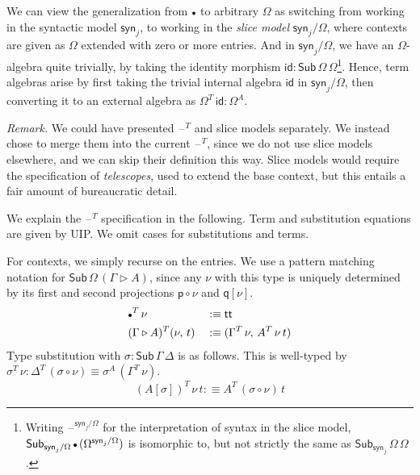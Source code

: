\documentclass[12pt,a4paper,twoside,openany]{book}
\theoremstyle{remark}
\theoremstyle{definition}
\theoremstyle{theorem}
\newcommand{\id}{\mathsf{id}}
\newcommand{\Sub}{\mathsf{Sub}}
\renewcommand{\tt}{\mathsf{tt}}
\newcommand{\blank}{\mathord{\hspace{1pt}\text{--}\hspace{1pt}}}
\newcommand{\ext}{\triangleright}
\newcommand{\emptycon}{\scaleobj{.75}\bullet}
\newcommand{\p}{\mathsf{p}}
\newcommand{\q}{\mathsf{q}}
\newcommand{\syn}{\mathsf{syn}}
\newcommand{\defn}{:\equiv}
\begin{document}
We can view the generalization from $\emptycon$ to arbitrary $\Omega$ as
switching from working in the syntactic model $\syn_j$, to working in the
\emph{slice model} $\syn_j/\Omega$, where contexts are given as $\Omega$ extended with
zero or more entries. And in $\syn_j/\Omega$, we have an $\Omega$-algebra quite
trivially, by taking the identity morphism $\id :
\Sub\,\Omega\,\Omega$\footnote{Writing $\blank^{\syn_j/\Omega}$ for the interpretation
of syntax in the slice model,
$\Sub_{\syn_j/\Omega}\,\emptycon\,(\Omega^{\syn_j/\Omega})$ is isomorphic to, but not
strictly the same as $\Sub_{\syn_j}\,\Omega\,\Omega$.}. Hence, term algebras
arise by first taking the trivial internal algebra $\id$ in $\syn_j/\Omega$,
then converting it to an external algebra as $\Omega^T\,\id : \Omega^A$.

\emph{Remark.} We could have presented $\blank^T$ and slice models separately.
We instead chose to merge them into the current $\blank^T$, since we do not use
slice models elsewhere, and we can skip their definition this way. Slice models
would require the specification of \emph{telescopes}, used to extend the base
context, but this entails a fair amount of bureaucratic detail.

We explain the $\blank^T$ specification in the following. Term and substitution
equations are given by UIP. We omit cases for substitutions and terms.

For contexts, we simply recurse on the entries. We use a pattern matching
notation for $\Sub\,\Omega\,(\Gamma\ext A)$, since any $\nu$ with this type is
uniquely determined by its first and second projections $\p\circ\nu$ and
$\q[\nu]$.
\begin{alignat*}{3}
  &\emptycon^T\,\nu           &&\defn \tt\\
  &(\Gamma \ext A)^T(\nu,\,t) &&\defn (\Gamma^T\,\nu,\,A^T\,\nu\,t)
\end{alignat*}
Type substitution with $\sigma : \Sub\,\Gamma\,\Delta$ is as follows. This is well-typed by
$\sigma^T\,\nu : \Delta^T\,(\sigma \circ \nu) \equiv \sigma^A\,(\Gamma^T\,\nu)$.
\[ (A[\sigma])^T\,\nu\,t \defn A^T\,(\sigma\circ\nu)\,t \]
\end{document}
